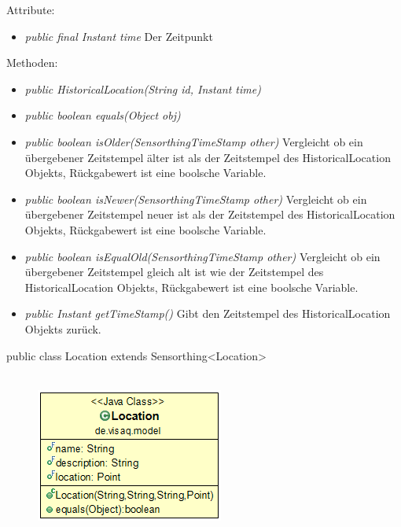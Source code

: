 Attribute:
\begin{itemize} 
	\item \emph{public final Instant time} Der Zeitpunkt
\end{itemize}
Methoden:
\begin{itemize} 
	\item \emph{public HistoricalLocation(String id, Instant time)} 
	\item \emph{public boolean equals(Object obj)} 
	\item \emph{public boolean isOlder(SensorthingTimeStamp other)} Vergleicht ob ein übergebener Zeitstempel älter ist als der Zeitstempel des HistoricalLocation Objekts, Rückgabewert ist eine boolsche Variable.
	\item \emph{public boolean isNewer(SensorthingTimeStamp other)} Vergleicht ob ein übergebener Zeitstempel neuer ist als der Zeitstempel des HistoricalLocation Objekts, Rückgabewert ist eine boolsche Variable.
	\item \emph{public boolean isEqualOld(SensorthingTimeStamp other)} Vergleicht ob ein übergebener Zeitstempel gleich alt ist wie der Zeitstempel des HistoricalLocation Objekts, Rückgabewert ist eine boolsche Variable.
	\item \emph{public Instant getTimeStamp()} Gibt den Zeitstempel des HistoricalLocation Objekts zurück.
\end{itemize}


public class Location extends Sensorthing<Location>
\\\\
\begin{minipage}{0.3\textwidth}
	\begin{figure}[H]
		\includegraphics[scale = 0.5
		]{media/frontend/model/LocationClass.png}
	\end{figure}
\end{minipage} \hfill
\begin{minipage}{0.6\textwidth}
\end{minipage}

